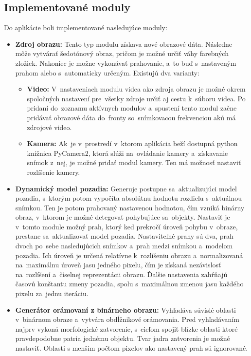         \subsection{Implementované moduly}
            Do aplikácie boli implementované nasledujúce moduly:
            \begin{itemize}
                \item \textbf{Zdroj obrazu:} Tento typ modulu získava nové obrazové dáta. Následne môže vytvárať šedotónový obraz, pričom je možné určiť váhy farebných zložiek. Nakoniec je možne vykonávať prahovanie, a~to buď s~nastaveným prahom alebo s~automaticky určeným. Existujú dva varianty: 
                \begin{itemize}
                    \item \textbf{Video:} V~nastaveniach modulu videa ako zdroja obrazu je možné okrem spoločných nastavení pre~všetky zdroje určiť aj cestu k~súboru videa. Po pridaní do~zoznamu aktívnych modulov a~spustení tento modul začne pridávať obrazové dáta do~fronty so~snímkovacou frekvenciou akú má zdrojové video.
                    \item \textbf{Kamera:} Ak~je v~prostredí v~ktorom aplikácia beží dostupná python knižnica PyCamera2, ktorá slúži na~ovládanie kamery a~získavanie snímok z~nej, je možné pridať modul kamery. Ten má možnosť nastaviť rozlíšenie kamery.
                \end{itemize}
                \item \textbf{Dynamický model pozadia:} Generuje postupne sa~aktualizujúci model pozadia, s~ktorým potom vypočíta absolútnu hodnotu rozdielu s~aktuálnou snímkou. Ten je potom prahovaný nastavenou hodnotou, čím vzniká binárny obraz, v~ktorom je možné detegovať pohybujúce sa~objekty. Nastaviť je v~tomto module možný prah, ktorý keď prekročí úroveň pohybu v~obraze, prestane sa~aktualizovať model pozadia. Nastaviteľné prahy sú dva, prah dvoch po~sebe nasledujúcich snímkov a~prah medzi snímkou a~modelom pozadia. Ich úroveň je určená relatívne k~rozlíšeniu obrazu a~normalizovaná na~maximálnu úroveň jasu jedného pixelu, čím je získaná nezávislosť na~rozlíšení a~číselnej reprezentácii obrazu. Ďalšie nastavenia zahŕňajú časovú konštantu zmeny pozadia, spolu s~maximálnou zmenou jasu každého pixelu za~jednu iteráciu. 
                \item \textbf{Generátor orámovaní z binárneho obrazu:} Vyhľadáva súvislé oblasti v~binárnom obraze a~vytvára obdĺžnikové orámovania. Pred vyhľadávaním najprv vykoná morfologické zatvorenie, s~cieľom spojiť blízke oblasti ktoré pravdepodobne patria jednému objektu. Tvar jadra zatvorenia je možné nastaviť. Oblasti s menším počtom pixelov ako nastavený prah sú ignorované.

\end{itemize}
